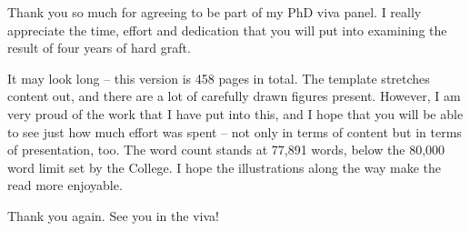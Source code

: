 
\begin{preamble}
{}

Thank you so much for agreeing to be part of my PhD viva panel. I really appreciate the time, effort and dedication that you will put into examining the result of four years of hard graft.

It may look long -- this version is 458 pages in total. The template stretches content out, and there are a lot of carefully drawn figures present. However, I am very proud of the work that I have put into this, and I hope that you will be able to see just how much effort was spent -- not only in terms of content but in terms of presentation, too. The word count stands at 77,891 words, below the 80,000 word limit set by the College. I hope the illustrations along the way make the read more enjoyable.

Thank you again. See you in the viva!
\end{preamble}